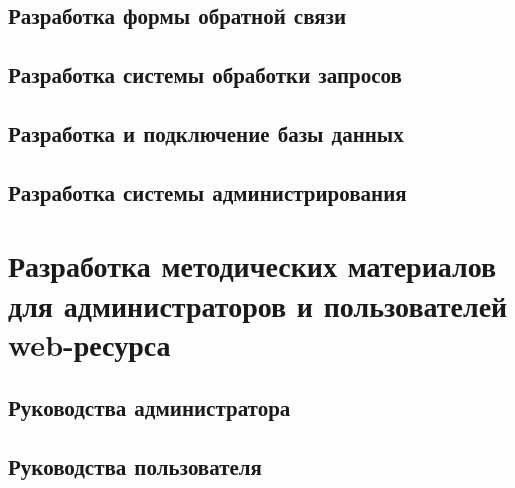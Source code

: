     \subsection{Разработка формы обратной связи}
    \subsection{Разработка системы обработки запросов}
    \subsection{Разработка и подключение базы данных}
    \subsection{Разработка системы администрирования}

\section{Разработка методических материалов для администраторов и пользователей web-ресурса}
    \subsection{Руководства администратора}
    \subsection{Руководства пользователя}

\clearpage
